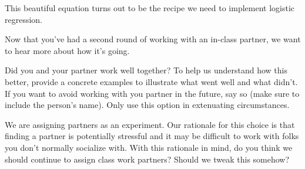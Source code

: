 \documentclass[assignment04_Solutions]{subfiles}
\begin{document}
This beautiful equation turns out to be the recipe we need to implement logistic regression.

\begin{exercise}
Now that you've had a second round of working with an in-class partner, we want to hear more about how it's going.
\bes
\item Did you and your partner work well together?  To help us understand how this better, provide a concrete examples to illustrate what went well and what didn't.  If you want to avoid working with you partner in the future, say so (make sure to include the person's name).  Only use this option in extenuating circumstances.
\item We are assigning partners as an experiment.  Our rationale for this choice is that finding a partner is potentially stressful and it may be difficult to work with folks you don't normally socialize with.  With this rationale in mind, do you think we should continue to assign class work partners?  Should we tweak this somehow?
\ees
\end{exercise}

%
%
%
%
%
%
\end{document}
